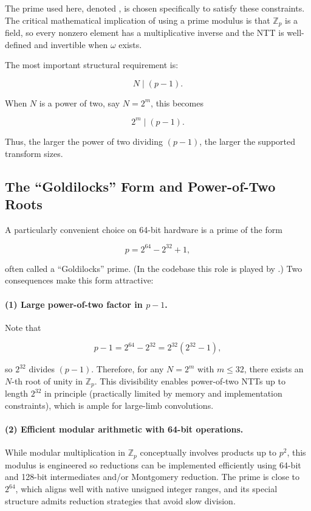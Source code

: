 The prime used here, denoted , is chosen specifically to
satisfy these constraints. The critical mathematical implication of using a
prime modulus is that $\mathbb{Z}_p$ is a field, so every nonzero element has a
multiplicative inverse and the NTT is well-defined and invertible when $\omega$
exists.

The most important structural requirement is:

\[
N \mid (p-1).
\]

When $N$ is a power of two, say $N = 2^m$, this becomes

\[
2^m \mid (p-1).
\]

Thus, the larger the power of two dividing $(p-1)$, the larger the supported
transform sizes.

\subsection{The ``Goldilocks'' Form and Power-of-Two Roots}

A particularly convenient choice on 64-bit hardware is a prime of the form

\[
p = 2^{64} - 2^{32} + 1,
\]

often called a ``Goldilocks'' prime. (In the codebase this role is played by
.) Two consequences make this form attractive:

\paragraph{(1) Large power-of-two factor in $p-1$.}

Note that

\[
p - 1 = 2^{64} - 2^{32} = 2^{32}\left(2^{32}-1\right),
\]

so $2^{32}$ divides $(p-1)$. Therefore, for any $N = 2^m$ with $m \le 32$, there
exists an $N$-th root of unity in $\mathbb{Z}_p$. This divisibility enables power-of-two NTTs
up to length $2^{32}$ in principle (practically limited by memory and
implementation constraints), which is ample for large-limb convolutions.

\paragraph{(2) Efficient modular arithmetic with 64-bit operations.}

While modular multiplication in $\mathbb{Z}_p$ conceptually involves products up
to $p^2$, this modulus is engineered so reductions can be implemented
efficiently using 64-bit and 128-bit intermediates and/or Montgomery reduction.
The prime is close to $2^{64}$, which aligns well with native unsigned integer
ranges, and its special structure admits reduction strategies that avoid slow
division.

